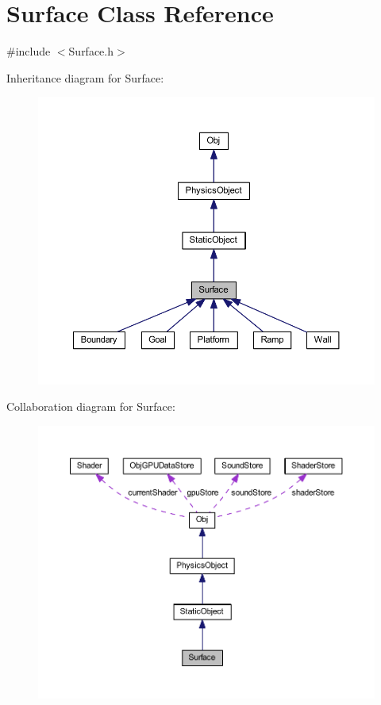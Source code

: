 \hypertarget{class_surface}{}\section{Surface Class Reference}
\label{class_surface}


{\ttfamily \#include $<$Surface.\+h$>$}



Inheritance diagram for Surface\+:
\nopagebreak
\begin{figure}[H]
\begin{center}
\leavevmode
\includegraphics[width=350pt]{class_surface__inherit__graph}
\end{center}
\end{figure}


Collaboration diagram for Surface\+:
\nopagebreak
\begin{figure}[H]
\begin{center}
\leavevmode
\includegraphics[width=350pt]{class_surface__coll__graph}
\end{center}
\end{figure}
